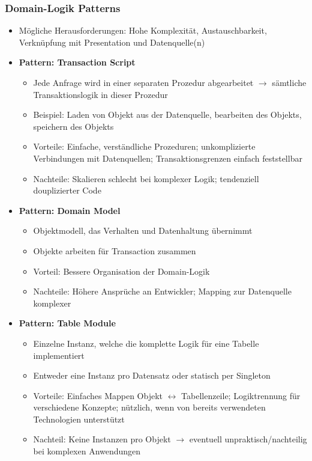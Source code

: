 \subsubsection{Domain-Logik Patterns}
\begin{itemize}
	\item Mögliche Herausforderungen: Hohe Komplexität, Austauschbarkeit, Verknüpfung mit Presentation und Datenquelle(n)
	\item \textbf{Pattern: Transaction Script}
	\begin{itemize}
		\item Jede Anfrage wird in einer separaten Prozedur abgearbeitet \(\rightarrow\) sämtliche Transaktionslogik in dieser Prozedur
		\item Beispiel: Laden von Objekt aus der Datenquelle, bearbeiten des Objekts, speichern des Objekts
		\item Vorteile: Einfache, verständliche Prozeduren; unkomplizierte Verbindungen mit Datenquellen; Transaktionsgrenzen einfach feststellbar
		\item Nachteile: Skalieren schlecht bei komplexer Logik; tendenziell douplizierter Code
	\end{itemize}
	\item \textbf{Pattern: Domain Model}
	\begin{itemize}
		\item Objektmodell, das Verhalten und Datenhaltung übernimmt
		\item Objekte arbeiten für Transaction zusammen
		\item Vorteil: Bessere Organisation der Domain-Logik
		\item Nachteile: Höhere Ansprüche an Entwickler; Mapping zur Datenquelle komplexer
	\end{itemize}
	\item \textbf{Pattern: Table Module}
	\begin{itemize}
		\item Einzelne Instanz, welche die komplette Logik für eine Tabelle implementiert
		\item Entweder eine Instanz pro Datensatz oder statisch per Singleton
		\item Vorteile: Einfaches Mappen Objekt \(\leftrightarrow\) Tabellenzeile; Logiktrennung für verschiedene Konzepte; nützlich, wenn von bereits verwendeten Technologien unterstützt
		\item Nachteil: Keine Instanzen pro Objekt \(\rightarrow\) eventuell unpraktisch/nachteilig bei komplexen Anwendungen
	\end{itemize}

\end{itemize}
